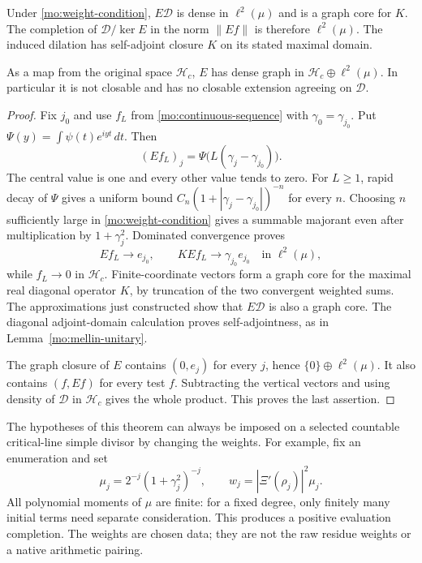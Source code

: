 \begin{theorem}
\label{mo:countable-completion}
Under \eqref{mo:weight-condition}, $E\mathscr D$ is dense in
$\ell^2(\mu)$ and is a graph core for $K$.
The completion of $\mathscr D/\ker E$ in the norm $\|Ef\|$
is therefore $\ell^2(\mu)$. The induced dilation has self-adjoint
closure $K$ on its stated maximal domain.

As a map from the original space $\mathscr H_c$, $E$ has dense
graph in $\mathscr H_c\oplus\ell^2(\mu)$. In particular it is
not closable and has no closable extension agreeing on
$\mathscr D$.
\end{theorem}
\begin{proof}
Fix $j_0$ and use $f_L$ from \eqref{mo:continuous-sequence} with
$\gamma_0=\gamma_{j_0}$. Put
$\Psi(y)=\int\psi(t)e^{iyt}\,dt$. Then
\[
 (Ef_L)_j=\Psi\bigl(L(\gamma_j-\gamma_{j_0})\bigr).
\]
The central value is one and every other value tends to zero.
For $L\geq1$, rapid decay of $\Psi$ gives a uniform bound
$C_n(1+|\gamma_j-\gamma_{j_0}|)^{-n}$ for every $n$.
Choosing $n$ sufficiently large in
\eqref{mo:weight-condition} gives a summable majorant even after
multiplication by $1+\gamma_j^2$. Dominated convergence proves
\[
 Ef_L\longrightarrow e_{j_0},\qquad
 KEf_L\longrightarrow\gamma_{j_0}e_{j_0}
 \quad\text{in }\ell^2(\mu),
\]
while $f_L\to0$ in $\mathscr H_c$.
Finite-coordinate vectors form a graph core for the maximal
real diagonal operator $K$, by truncation of the two convergent
weighted sums. The approximations just constructed show that
$E\mathscr D$ is also a graph core. The diagonal adjoint-domain
calculation proves self-adjointness, as in
Lemma~\ref{mo:mellin-unitary}.

The graph closure of $E$ contains $(0,e_j)$ for every $j$, hence
$\{0\}\oplus\ell^2(\mu)$. It also contains $(f,Ef)$ for every
test $f$. Subtracting the vertical vectors and using density of
$\mathscr D$ in $\mathscr H_c$ gives the whole product. This
proves the last assertion.
\end{proof}

The hypotheses of this theorem can always be imposed on a selected
countable critical-line simple divisor by changing the weights.
For example, fix an enumeration and set
\[
 \mu_j=2^{-j}(1+\gamma_j^2)^{-j},\qquad
 w_j=|\Xi'(\rho_j)|^2\mu_j.
\]
All polynomial moments of $\mu$ are finite: for a fixed degree,
only finitely many initial terms need separate consideration.
This produces a positive evaluation completion. The weights
are chosen data; they are not the raw residue weights or a native
arithmetic pairing.

